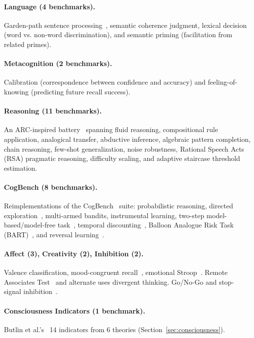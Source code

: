 \documentclass[11pt,letterpaper]{article}
\begin{document}
\paragraph{Language (4 benchmarks).} Garden-path sentence processing~\citep{ferreira2002good}, semantic coherence judgment, lexical decision (word vs. non-word discrimination), and semantic priming (facilitation from related primes).

\paragraph{Metacognition (2 benchmarks).} Calibration (correspondence between confidence and accuracy) and feeling-of-knowing (predicting future recall success).

\paragraph{Reasoning (11 benchmarks).} An ARC-inspired battery~\citep{chollet2019measure} spanning fluid reasoning, compositional rule application, analogical transfer, abductive inference, algebraic pattern completion, chain reasoning, few-shot generalization, noise robustness, Rational Speech Acts (RSA) pragmatic reasoning, difficulty scaling, and adaptive staircase threshold estimation.

\paragraph{CogBench (8 benchmarks).} Reimplementations of the CogBench~\citep{codaforno2024cogbench} suite: probabilistic reasoning, directed exploration~\citep{wilson2014humans}, multi-armed bandits, instrumental learning, two-step model-based/model-free task~\citep{daw2011model}, temporal discounting~\citep{kirby1999heroin}, Balloon Analogue Risk Task (BART)~\citep{lejuez2002evaluation}, and reversal learning~\citep{cools2002reversal}.

\paragraph{Affect (3), Creativity (2), Inhibition (2).} Valence classification, mood-congruent recall~\citep{bower1981mood}, emotional Stroop~\citep{williams1996emotional}. Remote Associates Test~\citep{mednick1962associative} and alternate uses divergent thinking. Go/No-Go and stop-signal inhibition~\citep{logan1984ability}.

\paragraph{Consciousness Indicators (1 benchmark).} Butlin et al.'s~\citep{butlin2023consciousness} 14 indicators from 6 theories (Section~\ref{sec:consciousness}).
\end{document}
